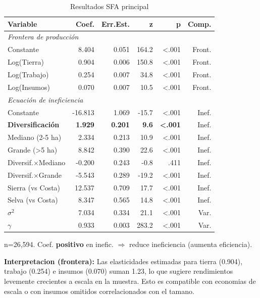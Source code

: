 \documentclass[10pt,a4paper]{article}
\begin{document}
\begin{table}[H]
\centering
\caption{Resultados SFA principal}
\label{tab:sfa_main}
\begin{threeparttable}
\small
\begin{tabular}{lrrrrr}
\toprule
\textbf{Variable} & \textbf{Coef.} & \textbf{Err.Est.} & \textbf{z} & \textbf{p} & \textbf{Comp.} \\
\midrule
\multicolumn{6}{l}{\textit{Frontera de producción}} \\
Constante & 8.404 & 0.051 & 164.2 & <.001 & Front. \\
Log(Tierra) & 0.904 & 0.006 & 150.8 & <.001 & Front. \\
Log(Trabajo) & 0.254 & 0.007 & 34.8 & <.001 & Front. \\
Log(Insumos) & 0.070 & 0.007 & 10.5 & <.001 & Front. \\
\midrule
\multicolumn{6}{l}{\textit{Ecuación de ineficiencia}} \\
Constante & -16.813 & 1.069 & -15.7 & <.001 & Inef. \\
\textbf{Diversificación} & \textbf{1.929} & \textbf{0.201} & \textbf{9.6} & \textbf{<.001} & Inef. \\
Mediano (2-5 ha) & 2.334 & 0.213 & 10.9 & <.001 & Inef. \\
Grande (>5 ha) & 8.842 & 0.390 & 22.6 & <.001 & Inef. \\
Diversif.$\times$Mediano & -0.200 & 0.243 & -0.8 & .411 & Inef. \\
Diversif.$\times$Grande & -5.543 & 0.289 & -19.2 & <.001 & Inef. \\
Sierra (vs Costa) & 12.537 & 0.709 & 17.7 & <.001 & Inef. \\
Selva (vs Costa) & 8.347 & 0.565 & 14.8 & <.001 & Inef. \\
\midrule
$\sigma^2$ & 7.034 & 0.334 & 21.1 & <.001 & Var. \\
$\gamma$ & 0.933 & 0.003 & 283.2 & <.001 & Var. \\
\bottomrule
\end{tabular}
\begin{tablenotes}
\footnotesize
\item n=26,594. Coef. \textbf{positivo} en inefic. $\Rightarrow$ reduce ineficiencia (aumenta eficiencia).
\end{tablenotes}
\end{threeparttable}
\end{table}

\textbf{Interpretacion (frontera):} Las elasticidades estimadas para tierra (0.904), trabajo (0.254) e insumos (0.070) suman 1.23, lo que sugiere rendimientos levemente crecientes a escala en la muestra. Esto es compatible con economias de escala o con insumos omitidos correlacionados con el tamano.
\end{document}
